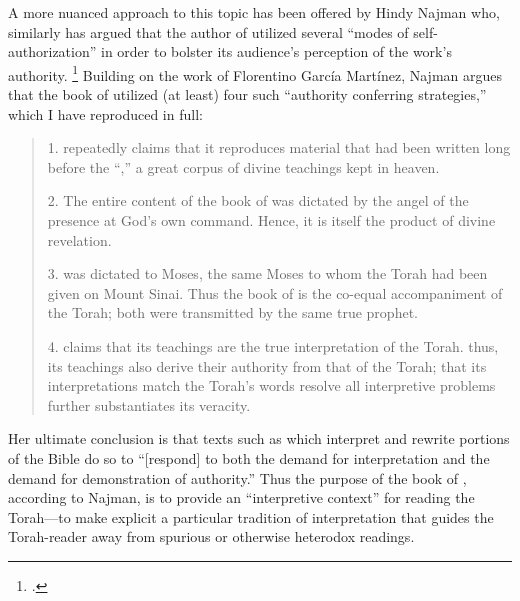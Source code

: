 A more nuanced approach to this topic has been offered by Hindy Najman who, similarly has argued that the author of \jub utilized several ``modes of self-authorization'' in order to bolster its audience's perception of the work's authority.%
    \footnote{\cite[380]{najman_jsj1999}.}
Building on the work of Florentino García Martínez,\autocite{martinez_najman-tigchelaar2012} Najman argues that the book of \jub utilized (at least) four such ``authority conferring strategies,'' which I have reproduced in full:
    \begin{quote}
        1. \jub repeatedly claims that it reproduces material that had been written long before the ``\heavenlytablets,'' a great corpus of divine teachings kept in heaven.

        2. The entire content of the book of \jub was dictated by the angel of the presence at God's own command. Hence, it is itself the product of divine revelation.

        3. \jub was dictated to Moses, the same Moses to whom the Torah had been given on Mount Sinai. Thus the book of \jub is the co-equal accompaniment of the Torah; both were transmitted by the same true prophet.

        4. \jub claims that its teachings are the true interpretation of the Torah. thus, its teachings also derive their authority from that of the Torah; that its interpretations match the Torah's words resolve all interpretive problems further substantiates its veracity.%
        \autocite[380]{najman_jsj1999}
    \end{quote}
\noindent
Her ultimate conclusion is that texts such as \jub which interpret and rewrite portions of the Bible do so to ``[respond] to both the demand for interpretation and the demand for demonstration of authority.''\autocite[408]{najman_jsj1999} Thus the purpose of the book of \jub, according to Najman, is to provide an ``interpretive context'' for reading the Torah---to make explicit a particular tradition of interpretation that guides the Torah-reader away from spurious or otherwise heterodox readings. 

